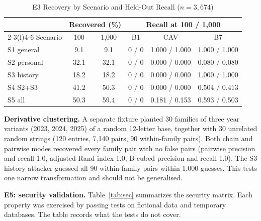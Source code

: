 \documentclass[conference]{IEEEtran}
\begin{document}
\begin{table}[t]
\caption{E3 Recovery by Scenario and Held-Out Recall ($n=3{,}674$)}
\label{tab:e3}
\centering\footnotesize
\begin{tabular}{@{}lccccc@{}}
\toprule
& \multicolumn{2}{c}{Recovered (\%)} & \multicolumn{3}{c}{Recall at 100 / 1,000}\\
\cmidrule(lr){2-3}\cmidrule(l){4-6}
Scenario & 100 & 1,000 & B1 & CAV & B7\\
\midrule
S1 general & 9.1 & 9.1 & 0 / 0 & 1.000 / 1.000 & 1.000 / 1.000\\
S2 personal & 32.1 & 32.1 & 0 / 0 & 0.000 / 0.000 & 0.080 / 0.080\\
S3 history & 18.2 & 18.2 & 0 / 0 & 0.000 / 0.000 & 1.000 / 1.000\\
S4 S2+S3 & 41.2 & 50.3 & 0 / 0 & 0.000 / 0.000 & 0.504 / 0.413\\
S5 all & 50.3 & 59.4 & 0 / 0 & 0.181 / 0.153 & 0.593 / 0.503\\
\bottomrule
\end{tabular}
\end{table}

\textbf{Derivative clustering.} A separate fixture planted 30 families of three year variants (2023, 2024, 2025) of a random 12-letter base, together with 30 unrelated random strings (120 entries, 7,140 pairs, 90 within-family pairs). Both chain and pairwise modes recovered every family pair with no false pairs (pairwise precision and recall 1.0, adjusted Rand index 1.0, B-cubed precision and recall 1.0). The S3 history attacker guessed all 90 within-family pairs within 1,000 guesses. This tests one narrow transformation and should not be generalised.

\textbf{E5: security validation.} Table~\ref{tab:sec} summarizes the security matrix. Each property was exercised by passing tests on fictional data and temporary databases. The table records what the tests do not cover.
\end{document}
